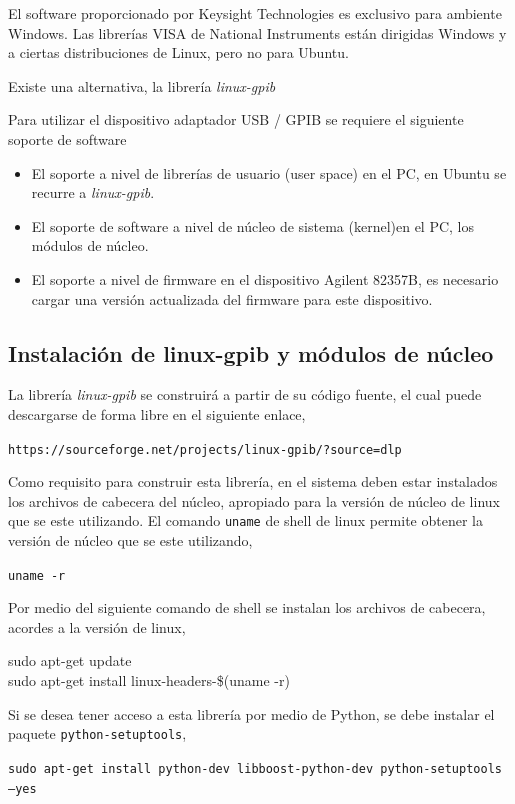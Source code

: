 \documentclass[paper=letter,oneside,fontsize=11pt, parskip=full]{scrartcl}
\newcommand{\code}[1]{{\ttfamily #1}}
\begin{document}
		El software proporcionado por Keysight Technologies es exclusivo para ambiente Windows. Las librerías VISA de National Instruments están dirigidas Windows y a ciertas distribuciones de Linux, pero no para Ubuntu.
		
		Existe una alternativa, la librería \emph{linux-gpib} 
		
		Para utilizar el dispositivo adaptador USB / GPIB se requiere el siguiente soporte de software
		
		\begin{itemize}
			\item El soporte a nivel de librerías de usuario (user space) en el PC, en Ubuntu se recurre a \emph{linux-gpib}.
			\item El soporte de software a nivel de núcleo de sistema (kernel)en el PC, los módulos de núcleo.
			\item El soporte a nivel de firmware en el dispositivo Agilent 82357B, es necesario cargar una versión actualizada del firmware para este dispositivo.
		\end{itemize}
	
		\subsection{Instalación de linux-gpib y módulos de núcleo}
		
		La librería \emph{linux-gpib} se construirá a partir de su código fuente, el cual puede descargarse de forma libre en el siguiente enlace,
		
		\texttt{https://sourceforge.net/projects/linux-gpib/?source=dlp}
		
		Como requisito para construir esta librería, en el sistema deben estar instalados los archivos de cabecera del núcleo, apropiado para la versión de núcleo de linux que se este utilizando. El comando \texttt{uname} de shell de linux permite obtener la versión de núcleo que se este utilizando,
		
		\texttt{uname -r}
		
		Por medio del siguiente comando de shell se instalan los archivos de cabecera, acordes a la versión de linux,
		
		\code{
			sudo apt-get update		\\
			sudo apt-get install linux-headers-\$(uname -r)
		}
		
		Si se desea tener acceso a esta librería por medio de Python, se debe instalar el paquete \texttt{python-setuptools},
		
		\texttt{sudo apt-get install python-dev libboost-python-dev python-setuptools --yes}
		
\end{document}
